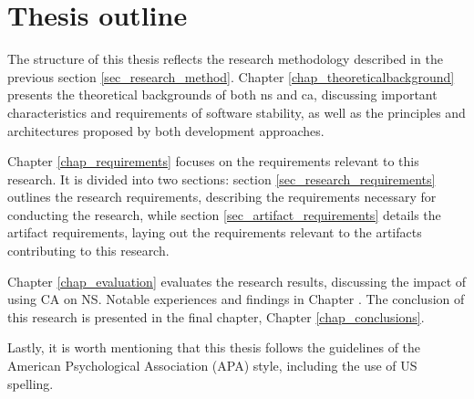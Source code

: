 \section{Thesis outline} \label{sec_structure}

The structure of this thesis reflects the research methodology described in the previous
section \ref{sec_research_method}. Chapter \ref{chap_theoreticalbackground} presents the
theoretical backgrounds of both \gls{ns} and \gls{ca}, discussing important
characteristics and requirements of software stability, as well as the principles and
architectures proposed by both development approaches.

Chapter \ref{chap_requirements} focuses on the requirements relevant to this research. It
is divided into two sections: section \ref{sec_research_requirements} outlines the
research requirements, describing the requirements necessary for conducting the research,
while section \ref{sec_artifact_requirements} details the artifact requirements, laying
out the requirements relevant to the artifacts contributing to this research.

Chapter \ref{chap_evaluation} evaluates the research results, discussing the impact of
using CA on NS. Notable experiences and findings in Chapter . The
conclusion of this research is presented in the final chapter, Chapter \ref{chap_conclusions}.

Lastly, it is worth mentioning that this thesis follows the guidelines of the American
Psychological Association (APA) style, including the use of US spelling.